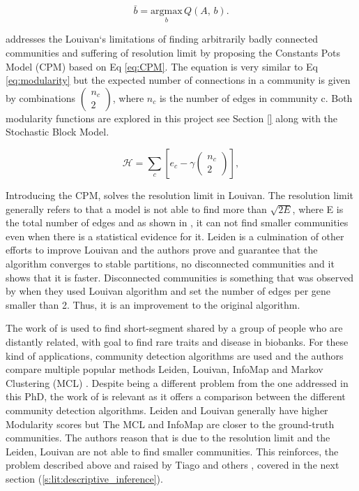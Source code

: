 \begin{equation} \label{eq:mod_max_per_com}
    \bar{b} = \underset{b}{\mathrm{argmax}} \, Q(A, \, b).
\end{equation}


\citet{Traag2019-ne} addresses the Louivan`s limitations of finding arbitrarily badly connected communities and suffering of resolution limit by proposing the Constants Pots Model (CPM) based on Eq \ref{eq:CPM}. The equation is very similar to Eq \ref{eq:modularity} but the expected number of connections in a community is given by combinations $(\begin{array}{c}{n}_{c}\\ 2\end{array})$, where $n_c$ is the number of edges in community c. Both modularity functions are explored in this project see Section \ref{} along with the Stochastic Block Model.

\begin{equation} \label{eq:CPM}
    {\mathcal H} ={\sum }_{c}[{e}_{c}-\gamma (\begin{array}{c}{n}_{c}\\ 2\end{array})],
\end{equation}


Introducing the CPM, \citet{Traag2019-ne} solves the resolution limit in Louivan. The resolution limit generally refers to that a model is not able to find more than $\sqrt{2E}$, where E is the total number of edges and as shown in \citet{Peixoto2021-jx}, it can not find smaller communities even when there is a statistical evidence for it. Leiden is a culmination of other efforts to improve Louivan\cite{Ozaki2016-dl,Waltman2013-zw,Bae2017-rz, Traag2015-tq} and the authors prove and guarantee that the algorithm converges to stable partitions, no disconnected communities and it shows that it is faster. Disconnected communities is something that was observed by \citet{Care2019-ij} when they used Louivan algorithm and set the number of edges per gene smaller than 2. Thus, it is an improvement to the original algorithm.

The work of \citet{Shemirani2023-ww} is used to find short-segment shared by a group of people who are distantly related, with goal to find rare traits and disease in biobanks. For these kind of applications, community detection algorithms are used and the authors compare multiple popular methods Leiden, Louivan, InfoMap \citet{Rosvall2008-kw} and Markov Clustering (MCL) \citet{Van_Dongen2008-yj}. Despite being a different problem from the one addressed in this PhD, the work of \citet{Shemirani2023-ww} is relevant as it offers a comparison between the different community detection algorithms. Leiden and Louivan generally have higher Modularity scores but The MCL and InfoMap are closer to the ground-truth communities. The authors reason that is due to the resolution limit and the Leiden, Louivan are not able to find smaller communities. This reinforces, the problem described above and raised by Tiago \citet{Peixoto2021-jx} and others \cite{Fortunato2007-gh, Traag2019-ne}, covered in the next section (\ref{s:lit:descriptive_inference}).

